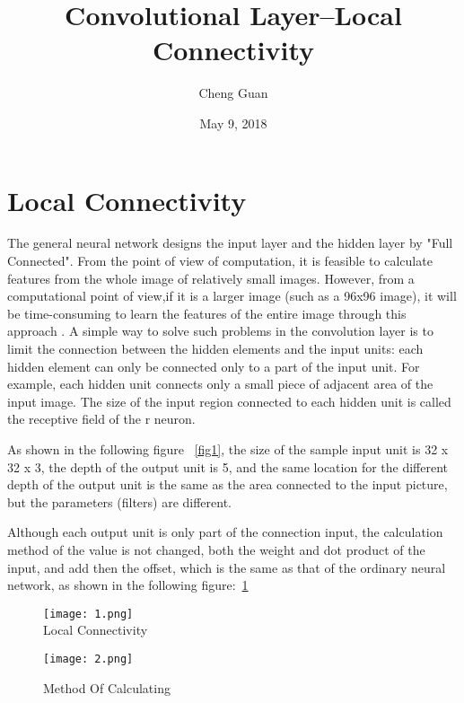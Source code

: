 \documentclass[12pt,twocolumn]{article}
\begin{document}
\title{Convolutional Layer--Local Connectivity}
\author{Cheng Guan}
\date{May 9, 2018}
\maketitle
\section{Local Connectivity}

  The general neural network designs the input layer and the hidden layer
  by "Full Connected". From the point of view of computation,
  it is feasible to calculate features from the whole image of relatively small images.
  However, from a computational point of view,if it is a larger image (such as a 96x96 image),
  it will be time-consuming to learn the features of the entire image through this approach .
  A simple way to solve such problems in the convolution layer is to limit the connection
  between the hidden elements and the input units: each hidden element can only be connected only to a part of the input unit.
  For example, each hidden unit connects only a small piece of adjacent area of the input image.
  The size of the input region connected to each hidden unit is called the receptive field of the r neuron.

  As shown in the following figure ~\ref{fig1}, the size of the sample input unit is 32 x 32 x 3,
  the depth of the output unit is 5, and the same location for the different depth of the output unit is the same as the area connected to the input picture,
  but the parameters (filters) are different. \cite{test2}

 Although each output unit is only part of the connection input,
 the calculation method of the value is not changed, both the weight and dot product of the input,
 and add then the offset, which is the same as that of the ordinary neural network, as shown in the following figure:~\ref{fig2}

 \begin{figure}[ht]
 \centering
 \texttt{[image: 1.png]}\\
 \caption{Local Connectivity}
 \label{fig1}
 \texttt{[image: 2.png]}\\
 \caption{Method Of Calculating}
 \label{fig2}
\end{figure}




\end{document}
